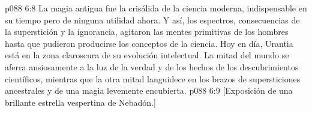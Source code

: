 \vs p088 6:8 La magia antigua fue la crisálida de la ciencia moderna, indispensable en su tiempo pero de ninguna utilidad ahora. Y así, los espectros, consecuencias de la superstición y la ignorancia, agitaron las mentes primitivas de los hombres hasta que pudieron producirse los conceptos de la ciencia. Hoy en día, Urantia está en la zona claroscura de su evolución intelectual. La mitad del mundo se aferra ansiosamente a la luz de la verdad y de los hechos de los descubrimientos científicos, mientras que la otra mitad languidece en los brazos de supersticiones ancestrales y de una magia levemente encubierta.
\vsetoff
\vs p088 6:9 [Exposición de una brillante estrella vespertina de Nebadón.]
